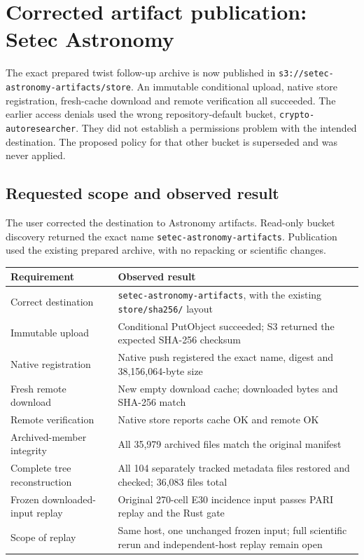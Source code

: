 \documentclass[
  10pt,
]{article}
\author{}
\date{}
\begin{document}
\section{Corrected artifact publication: Setec
Astronomy}\label{corrected-artifact-publication-setec-astronomy}

The exact prepared twist follow-up archive is now published in
\texttt{s3://setec-astronomy-artifacts/store}. An immutable conditional
upload, native store registration, fresh-cache download and remote
verification all succeeded. The earlier access denials used the wrong
repository-default bucket, \texttt{crypto-autoresearcher}. They did not
establish a permissions problem with the intended destination. The
proposed policy for that other bucket is superseded and was never
applied.

\subsection{Requested scope and observed
result}\label{requested-scope-and-observed-result}

The user corrected the destination to Astronomy artifacts. Read-only
bucket discovery returned the exact name
\texttt{setec-astronomy-artifacts}. Publication used the existing
prepared archive, with no repacking or scientific changes.

\begin{longtable}[]{@{}ll@{}}
\toprule\noalign{}
Requirement & Observed result \\
\midrule\noalign{}
\endhead
\bottomrule\noalign{}
\endlastfoot
Correct destination & \texttt{setec-astronomy-artifacts}, with the
existing \texttt{store/sha256/} layout \\
Immutable upload & Conditional PutObject succeeded; S3 returned the
expected SHA-256 checksum \\
Native registration & Native push registered the exact name, digest and
38,156,064-byte size \\
Fresh remote download & New empty download cache; downloaded bytes and
SHA-256 match \\
Remote verification & Native store reports cache OK and remote OK \\
Archived-member integrity & All 35,979 archived files match the original
manifest \\
Complete tree reconstruction & All 104 separately tracked metadata files
restored and checked; 36,083 files total \\
Frozen downloaded-input replay & Original 270-cell E30 incidence input
passes PARI replay and the Rust gate \\
Scope of replay & Same host, one unchanged frozen input; full scientific
rerun and independent-host replay remain open \\
\end{longtable}
\end{document}
